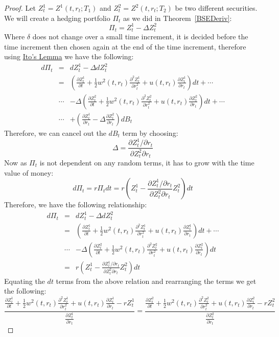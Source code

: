 \documentclass[11pt]{article}
\theoremstyle{definition}
\newcommand{\brac}[1]{\left(#1\right)}
\newcommand{\pardiff}[2]{\frac{\partial #1}{\partial #2}}
\newcommand{\Zone}{Z^1_t}
\newcommand{\Ztwo}{Z^2_t}
\begin{document}
	\begin{proof}
		Let $\Zone = Z^1\brac{t,r_t;T_1}$ and $\Ztwo = Z^2\brac{t,r_t;T_2}$ be two different securities. We will create a hedging portfolio $\Pi_t$ as we did in Theorem~\ref{BSEDeriv}:
		$$\Pi_t = \Zone - \Delta \Ztwo$$
		Where $\delta$ does not change over a small time increment, it is decided before the time increment then chosen again at the end of the time increment, therefore using \hyperref[itosLemma]{Ito's Lemma} we have the following:
		\begin{eqnarray*}
			d\Pi_t &=& d\Zone - \Delta d\Ztwo\\
			&=& \brac{\pardiff{\Zone}{t}+\frac{1}{2}w^2\brac{t,r_t}\pardiff{^2\Zone}{r_t^2} + u\brac{t,r_t}\pardiff{\Zone}{r_t}}dt + \cdots\\
			&\cdots& -\Delta \brac{\pardiff{\Ztwo}{t}+\frac{1}{2}w^2\brac{t,r_t}\pardiff{^2\Ztwo}{r_t^2} + u\brac{t,r_t}\pardiff{\Ztwo}{r_t}}dt + \cdots\\
			&\cdots& + \brac{\pardiff{\Zone}{r_t}-\Delta\pardiff{\Ztwo}{r_t}}dB_t
		\end{eqnarray*}
		Therefore, we can cancel out the $dB_t$ term by choosing:
		$$\Delta = \frac{\partial\Zone/\partial r_t}{\partial\Ztwo\partial r_t}$$
		Now as $\Pi_t$ is not dependent on any random terms, it has to grow with the time value of money:
		$$d\Pi_t = r\Pi_t dt = r\brac{\Zone - \frac{\partial\Zone/\partial r_t}{\partial\Ztwo\partial r_t} \Ztwo}dt$$
		Therefore, we have the following relationship:
		\begin{eqnarray*}
			d\Pi_t &=& d\Zone - \Delta d\Ztwo\\
			&=& \brac{\pardiff{\Zone}{t}+\frac{1}{2}w^2\brac{t,r_t}\pardiff{^2\Zone}{r_t^2} + u\brac{t,r_t}\pardiff{\Zone}{r_t}}dt + \cdots\\
			&\cdots& -\Delta \brac{\pardiff{\Ztwo}{t}+\frac{1}{2}w^2\brac{t,r_t}\pardiff{^2\Ztwo}{r_t^2} + u\brac{t,r_t}\pardiff{\Ztwo}{r_t}}dt\\
			&=& r\brac{\Zone - \frac{\partial\Zone/\partial r_t}{\partial\Ztwo\partial r_t} \Ztwo}dt
		\end{eqnarray*}
		Equating the $dt$ terms from the above relation and rearranging the terms we get the following:
		 \begin{equation}\label{eqn3}
		 \frac{\pardiff{\Zone}{t}+\frac{1}{2}w^2\brac{t,r_t}\pardiff{^2\Zone}{r_t^2} + u\brac{t,r_t}\pardiff{\Zone}{r_t} - r\Zone}{\pardiff{\Zone}{r_t}} = \frac{\pardiff{\Ztwo}{t}+\frac{1}{2}w^2\brac{t,r_t}\pardiff{^2\Ztwo}{r_t^2} + u\brac{t,r_t}\pardiff{\Ztwo}{r_t} - r\Ztwo}{\pardiff{\Ztwo}{r_t}}

\end{equation}
\end{proof}
\end{document}
